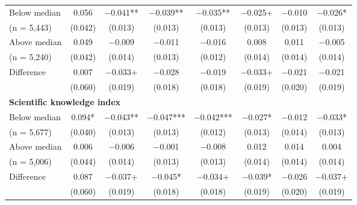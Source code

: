 \documentclass[letterpaper, 12pt, parskip=full,DIV=10]{scrartcl}
\begin{document}
\begin{table}[H]
{\begin{tabular}{lccccccc}
\hspace{1em} Below median 		& \num{0.056} & \num{-0.041}** & \num{-0.039}** & \num{-0.035}** & \num{-0.025}+ & \num{-0.010} & \num{-0.026}*\\
\hspace{1.5em}  (n = 5,443)		& (\num{0.042}) & (\num{0.013}) & (\num{0.013}) & (\num{0.013}) & (\num{0.013}) & (\num{0.013}) & (\num{0.013})\\
\hspace{1em} Above median 		& \num{0.049} & \num{-0.009} & \num{-0.011} & \num{-0.016} & \num{0.008} & \num{0.011} & \num{-0.005}\\
\hspace{1.5em} (n = 5,240)  		& (\num{0.042}) & (\num{0.014}) & (\num{0.013}) & (\num{0.012}) & (\num{0.014}) & (\num{0.014}) & (\num{0.014})\\
 \cmidrule(lr){2-8}
\hspace{1em} Difference 			& \num{0.007} & \num{-0.033}+ & \num{-0.028} & \num{-0.019} & \num{-0.033}+ & \num{-0.021} & \num{-0.021}\\
 							& (\num{0.060}) & (\num{0.019}) & (\num{0.018}) & (\num{0.018}) & (\num{0.019}) & (\num{0.020}) & (\num{0.019})\\
 \multicolumn{4}{l}{\textbf{Scientific knowledge index }}  \rule{0pt}{1.2\normalbaselineskip}\\
\hspace{1em}   Below median  			& \num{0.094}* & \num{-0.043}** & \num{-0.047}*** & \num{-0.042}*** & \num{-0.027}* & \num{-0.012} & \num{-0.033}*\\
\hspace{1.5em} (n = 5,677)			& (\num{0.040}) & (\num{0.013}) & (\num{0.013}) & (\num{0.012}) & (\num{0.013}) & (\num{0.014}) & (\num{0.013})\\
\hspace{1em}   Above median			& \num{0.006} & \num{-0.006} & \num{-0.001} & \num{-0.008} & \num{0.012} & \num{0.014} & \num{0.004}\\
\hspace{1.5em}  (n = 5,006) 			& (\num{0.044}) & (\num{0.014}) & (\num{0.013}) & (\num{0.013}) & (\num{0.014}) & (\num{0.014}) & (\num{0.014})\\
 \cmidrule(lr){2-8}
\hspace{1em}   Difference 			& \num{0.087} 	& \num{-0.037}+ & \num{-0.045}* & \num{-0.034}+ & \num{-0.039}* & \num{-0.026} & \num{-0.037}+\\
 								& (\num{0.060}) & (\num{0.019}) & (\num{0.018}) & (\num{0.018}) & (\num{0.019}) & (\num{0.020}) & (\num{0.019})\\

\end{tabular}}
\end{table}
\end{document}
